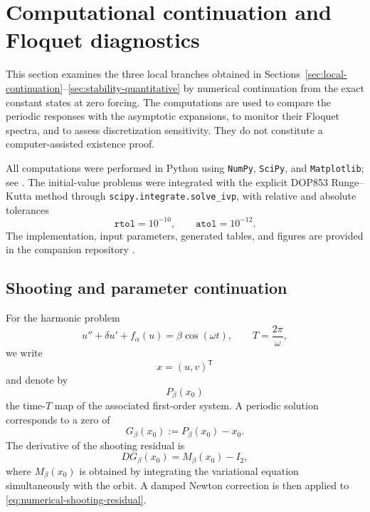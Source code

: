 \section{Computational continuation and Floquet diagnostics}
\label{sec:numerics}

This section examines the three local branches obtained in
Sections~\ref{sec:local-continuation}--\ref{sec:stability-quantitative}
by numerical continuation from the exact constant states at zero
forcing. The computations are used to compare the periodic responses
with the asymptotic expansions, to monitor their Floquet spectra, and
to assess discretization sensitivity. They do not constitute a
computer-assisted existence proof.

All computations were performed in Python using \texttt{NumPy},
\texttt{SciPy}, and \texttt{Matplotlib}; see
\cite{VirtanenEtAl2020}. The initial-value problems were integrated with
the explicit DOP853 Runge--Kutta method through
\texttt{scipy.integrate.solve\_ivp}, with relative and absolute
tolerances
\[
\texttt{rtol}=10^{-10},
\qquad
\texttt{atol}=10^{-12}.
\]
The implementation, input parameters, generated tables, and figures are
provided in the companion repository
\cite{LopezCastroRamirezCode2026}.

\subsection{Shooting and parameter continuation}
\label{subsec:numerical-shooting}

For the harmonic problem
\begin{equation}
\label{eq:numerical-harmonic-problem}
 u''+\delta u'+f_{\alpha}(u)=\beta\cos(\omega t),
 \qquad
 T=\frac{2\pi}{\omega},
\end{equation}
we write
\[
 x=(u,v)^{\mathsf T}
\]
and denote by
\[
 P_{\beta}(x_0)
\]
the time-$T$ map of the associated first-order system. A periodic
solution corresponds to a zero of
\begin{equation}
\label{eq:numerical-shooting-residual}
 G_{\beta}(x_0)
 :=
 P_{\beta}(x_0)-x_0.
\end{equation}
The derivative of the shooting residual is
\begin{equation}
\label{eq:numerical-shooting-jacobian}
 D G_{\beta}(x_0)
 =
 M_{\beta}(x_0)-I_2,
\end{equation}
where $M_{\beta}(x_0)$ is obtained by integrating the variational
equation simultaneously with the orbit. A damped Newton correction is
then applied to \eqref{eq:numerical-shooting-residual}.

